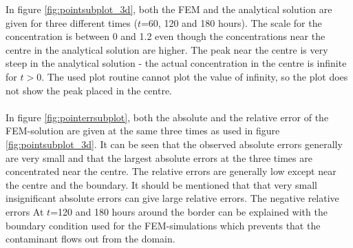 In figure \ref{fig:pointsubplot_3d}, both the FEM and the
analytical solution are given for three different times ($t$=60, 120 and
180 hours). The scale for the concentration is between 0 and 1.2 even
though the concentrations near the centre in the analytical
solution are higher. The peak near the centre is very steep in the
analytical solution - the actual concentration in the centre is
infinite for $t>0$. The used plot routine cannot plot the value of
infinity, so the plot does not show the peak placed in the centre.\\
\\
In figure \ref{fig:pointerrsubplot}, both the absolute and the
relative error of the FEM-solution are given at the same three times as
used in figure \ref{fig:pointsubplot_3d}. It can be seen that the
observed absolute errors generally are very small and that the largest
absolute errors at the three times are concentrated near the
centre. The relative errors are generally low except near the centre
and the boundary. It should be mentioned that that very small insignificant
absolute errors can give large relative errors. The negative relative
errors At $t$=120 and 180 hours around the border can be explained
with the boundary condition used for the FEM-simulations which
prevents that the contaminant flows out from the domain.






